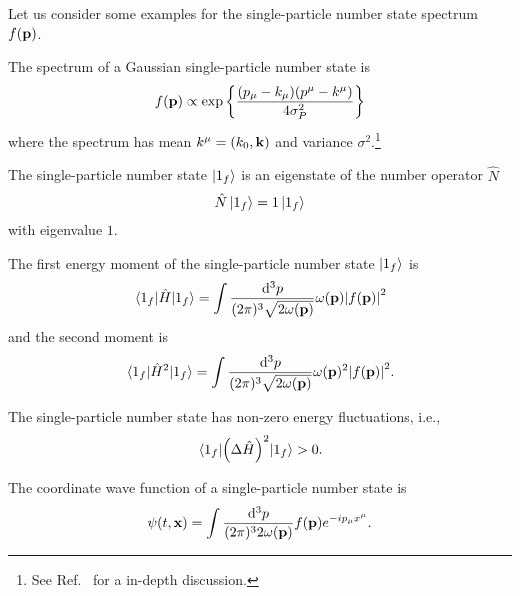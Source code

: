 Let us consider some examples for the single-particle number state spectrum $f(\vb{p})$.
\begin{example}
	The spectrum of a Gaussian single-particle number state is
	\begin{equation}
		f(\vb{p})
		\propto
		\exp\left\{
			\frac{(p_\mu-k_\mu)(p^\mu-k^\mu)}{4\sigma_P^2}
		\right\}
		\label{eq:covariant_gaussian_spectrum}
	\end{equation}
	where the spectrum has mean $k^\mu=(k_0,\vb{k})$ and variance $\sigma^2$.\footnote{See Ref.~\cite{Naumov2013,Naumov2009} for a in-depth discussion.}
\end{example}
\begin{theorem}\label{thm:single_particle_number_state_number_eigenstate}
	The single-particle number state $\ket{1_f}$ is an eigenstate of the number operator $\hat{N}$
	\begin{equation}
		\hat{N}
		\ket{1_f}
		=
		1
		\ket{1_f}
	\end{equation}
	with eigenvalue $1$.
\end{theorem}
\begin{lemma}\label{thm:single_particle_number_state_energy}
	The first energy moment of the single-particle number state $\ket{1_f}$ is
	\begin{equation}
		\expval{\hat{H}}{1_f}
		=
		\int\frac{\dd[3]{p}}{(2\pi)^3\sqrt{2\omega(\vb{p})}}
		\omega(\vb{p})
		\abs{f(\vb{p})}^2
	\end{equation}
	and the second moment is
	\begin{equation}
		\expval{\hat{H}^2}{1_f}
		=
		\int\frac{\dd[3]{p}}{(2\pi)^3\sqrt{2\omega(\vb{p})}}
		\omega(\vb{p})^2
		\abs{f(\vb{p})}^2
		.
	\end{equation}
\end{lemma}
\begin{corollary}
	The single-particle number state has non-zero energy fluctuations, i.e.,
	\begin{equation}
		\expval{\left(\Delta\hat{H}\right)^2}{1_f}
		>
		0
		.
	\end{equation}
\end{corollary}
\begin{lemma}\label{thm:single_particle_number_state_wave_function}
	The coordinate wave function of a single-particle number state is
	\begin{equation}
		\psi(t,\vb{x})
		=
		\int\frac{\dd[3]{p}}{(2\pi)^32\omega(\vb{p})}
		f(\vb{p})e^{-ip_\mu x^\mu}
		.
	\end{equation}
\end{lemma}
